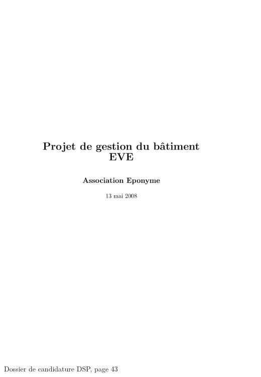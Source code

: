 \includegraphics[scale=0.85,trim=20mm 20mm 20mm 20mm,clip,page=43]{annexes/candidature_dsp.pdf} \\
Dossier de candidature DSP, page 43
\newpage
